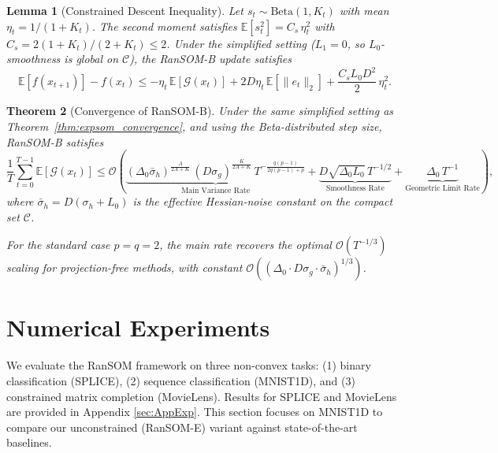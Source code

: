 \documentclass{article}
\theoremstyle{plain}
\newtheorem{theorem}{Theorem}[section]
\newtheorem{lemma}[theorem]{Lemma}
\theoremstyle{definition}
\theoremstyle{remark}
\begin{document}
\begin{lemma}[Constrained Descent Inequality]
\label{lemma:constrained_descent}
Let $s_t \sim \mathrm{Beta}(1, K_t)$ with mean $\eta_t = 1/(1 + K_t)$.
The second moment satisfies $\mathbb{E}[s_t^2] = C_s\,\eta_t^2$ with
$C_s = 2(1+K_t)/(2+K_t) \le 2$. Under the simplified setting ($L_1 =
0$, so $L_0$-smoothness is global on $\mathcal{C}$), the RanSOM-B
update satisfies
\begin{equation}
\label{eq:constrained_descent}
    \mathbb{E}[f(x_{t+1})] - f(x_t)
    \le -\eta_t\,\mathbb{E}[\mathcal{G}(x_t)]
      + 2D\eta_t\,\mathbb{E}[\|e_t\|_2]
      + \frac{C_s L_0 D^2}{2}\,\eta_t^2.
\end{equation}
\end{lemma}


\begin{theorem}[Convergence of RanSOM-B]
\label{thm:betasom_convergence}
Under the same simplified setting as Theorem~\ref{thm:expsom_convergence},
and using the Beta-distributed step size, RanSOM-B satisfies
\begin{equation}
\label{eq:betasom_rate}
    \frac{1}{T}\sum_{t=0}^{T-1}\mathbb{E}[\mathcal{G}(x_t)]
    \le
    \mathcal{O}\!\left(\underbrace{
        (\Delta_0\bar\sigma_h)^{\tfrac{A}{2A+K}}\,
        (D\sigma_g)^{\tfrac{K}{2A+K}}\,
        T^{-\tfrac{q(p-1)}{2q(p-1)+p}}
    }_{\text{Main Variance Rate}}
    + \underbrace{D\sqrt{\Delta_0 L_0}\,T^{-1/2}}_{\text{Smoothness Rate}}
    + \underbrace{\Delta_0\,T^{-1}}_{\text{Geometric Limit Rate}}\right),
\end{equation}
where $\bar\sigma_h = D(\sigma_h + L_0)$ is the effective Hessian-noise
constant on the compact set $\mathcal{C}$.
 
For the standard case $p = q = 2$, the main rate recovers the optimal
$\mathcal{O}(T^{-1/3})$ scaling for projection-free methods, with
constant $\mathcal{O}((\Delta_0 \cdot D\sigma_g \cdot \bar\sigma_h)^{1/3})$.
\end{theorem}


\section{Numerical Experiments}

We evaluate the RanSOM framework on three non-convex tasks: (1) binary classification (SPLICE), (2) sequence classification (MNIST1D), and (3) constrained matrix completion (MovieLens). Results for SPLICE and MovieLens are provided in Appendix \ref{sec:AppExp}. This section focuses on MNIST1D to compare our unconstrained (RanSOM-E) variant against state-of-the-art baselines.
\end{document}
